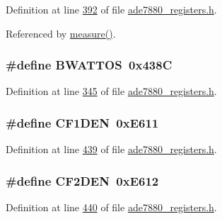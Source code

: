 Definition at line \hyperlink{a00036_source_l00392}{392} of file \hyperlink{a00036_source}{ade7880\-\_\-registers.\-h}.



Referenced by \hyperlink{a00042_source_l00040}{measure()}.

\hypertarget{a00036_a9c20ee65c3ba9c0fc123fc2a262d02e7}{
\subsubsection[{B\-W\-A\-T\-T\-O\-S}]{\setlength{\rightskip}{0pt plus 5cm}\#define B\-W\-A\-T\-T\-O\-S~0x438\-C}}\label{de/d8c/a00036_a9c20ee65c3ba9c0fc123fc2a262d02e7}


Definition at line \hyperlink{a00036_source_l00345}{345} of file \hyperlink{a00036_source}{ade7880\-\_\-registers.\-h}.

\hypertarget{a00036_ab5d23f853f029333e3b4e734325c810b}{
\subsubsection[{C\-F1\-D\-E\-N}]{\setlength{\rightskip}{0pt plus 5cm}\#define C\-F1\-D\-E\-N~0x\-E611}}\label{de/d8c/a00036_ab5d23f853f029333e3b4e734325c810b}


Definition at line \hyperlink{a00036_source_l00439}{439} of file \hyperlink{a00036_source}{ade7880\-\_\-registers.\-h}.

\hypertarget{a00036_ae1659576b77ff128469caf7fa1cc62ff}{
\subsubsection[{C\-F2\-D\-E\-N}]{\setlength{\rightskip}{0pt plus 5cm}\#define C\-F2\-D\-E\-N~0x\-E612}}\label{de/d8c/a00036_ae1659576b77ff128469caf7fa1cc62ff}


Definition at line \hyperlink{a00036_source_l00440}{440} of file \hyperlink{a00036_source}{ade7880\-\_\-registers.\-h}.

